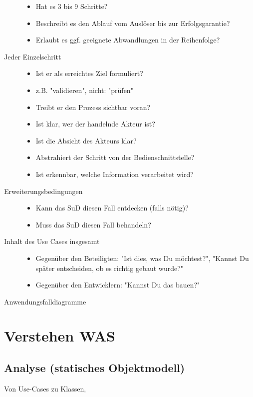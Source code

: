 \begin{description}
\begin{itemize}
	\item Hat es 3 bis 9 Schritte?
	\item Beschreibt es den Ablauf vom Auslöser bis zur Erfolgsgarantie?
	\item Erlaubt es ggf. geeignete Abwandlungen in der Reihenfolge?
	\end{itemize}
\item[Jeder Einzelschritt]
\begin{itemize}
	\item Ist er als erreichtes Ziel formuliert?
	\item z.B. "validieren", nicht: "prüfen"
	\item Treibt er den Prozess sichtbar voran?
	\item Ist klar, wer der handelnde Akteur ist?
	\item Ist die Absicht des Akteurs klar?
	\item Abstrahiert der Schritt von der Bedienschnittstelle?
	\item Ist erkennbar, welche Information verarbeitet wird?
	\end{itemize}
\item[Erweiterungsbedingungen]
\begin{itemize}
	\item Kann das SuD diesen Fall entdecken (falls nötig)?
	\item Muss das SuD diesen Fall behandeln?
	\end{itemize}
\item[Inhalt des Use Cases insgesamt]
\begin{itemize}
	\item Gegenüber den Beteiligten: "Ist dies, was Du möchtest?",
	"Kannst Du später entscheiden, ob es richtig gebaut wurde?"
	\item Gegenüber den Entwicklern: "Kannst Du das bauen?"
	\end{itemize}
\end{description}

Anwendungsfalldiagramme

\section{Verstehen WAS}

\subsection{Analyse (statisches Objektmodell)}
Von Use-Cases zu Klassen,

